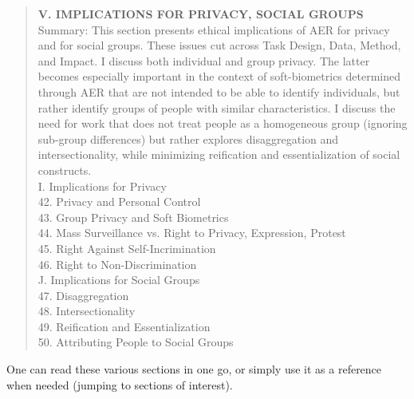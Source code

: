 \documentclass{clv3}
\begin{document}
\begin{quote}
\noindent \textbf{V. IMPLICATIONS FOR PRIVACY, SOCIAL GROUPS}\\[5pt]
Summary: This section presents ethical implications of AER for privacy and for social groups. These issues cut across Task Design, Data, Method, and Impact. 
I discuss both individual and group privacy. %
The latter becomes especially important in the context of soft-biometrics determined through AER that are not intended to be able to identify individuals, but rather identify groups of people with similar characteristics. 
I discuss the need for work that does not treat people as a homogeneous group (ignoring sub-group differences) 
but rather explores disaggregation and  intersectionality, while minimizing reification and essentialization of social constructs.\\[5pt] %
I. Implications for Privacy\\[3pt]
\hspace*{3mm}  42. Privacy and Personal Control\\
\hspace*{3mm}  43. Group Privacy and Soft Biometrics\\
\hspace*{3mm}  44. Mass Surveillance vs. Right to Privacy, Expression, Protest\\
\hspace*{3mm}  45. Right Against Self-Incrimination\\
\hspace*{3mm}  46. Right to Non-Discrimination\\[5pt]
J. Implications for Social Groups\\[3pt]
\hspace*{3mm}  47. Disaggregation\\
\hspace*{3mm}  48. Intersectionality\\
\hspace*{3mm}  49. Reification and Essentialization\\
\hspace*{3mm}  50. Attributing People to Social Groups
 \end{quote}
\vspace*{-3mm}
\noindent One can read these various sections in one go, or simply use it as a reference when needed (jumping to sections of interest).
\end{document}
